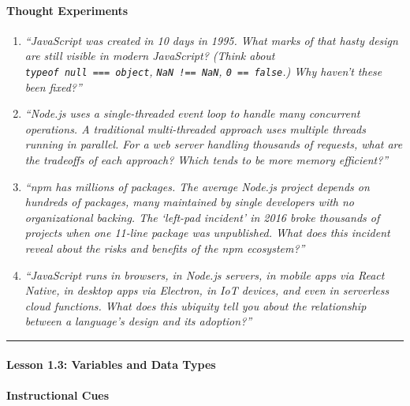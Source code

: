 \documentclass[
  justified,
  openright,
]{tufte-book}
\let\subsection\paragraph
\let\paragraph\paragraph
\let\subsection\paragraph
\let\paragraph\paragraph
\begin{document}
\paragraph{Thought Experiments}\label{thought-experiments-18}

\begin{enumerate}
\def\labelenumi{\arabic{enumi}.}
\item
  \emph{``JavaScript was created in 10 days in 1995. What marks of that
  hasty design are still visible in modern JavaScript? (Think about
  \texttt{typeof\ null\ ===\ \textquotesingle{}object\textquotesingle{}},
  \texttt{NaN\ !==\ NaN}, \texttt{0\ ==\ false}.) Why haven't these been
  fixed?''}
\item
  \emph{``Node.js uses a single-threaded event loop to handle many
  concurrent operations. A traditional multi-threaded approach uses
  multiple threads running in parallel. For a web server handling
  thousands of requests, what are the tradeoffs of each approach? Which
  tends to be more memory efficient?''}
\item
  \emph{``npm has millions of packages. The average Node.js project
  depends on hundreds of packages, many maintained by single developers
  with no organizational backing. The `left-pad incident' in 2016 broke
  thousands of projects when one 11-line package was unpublished. What
  does this incident reveal about the risks and benefits of the npm
  ecosystem?''}
\item
  \emph{``JavaScript runs in browsers, in Node.js servers, in mobile
  apps via React Native, in desktop apps via Electron, in IoT devices,
  and even in serverless cloud functions. What does this ubiquity tell
  you about the relationship between a language's design and its
  adoption?''}
\end{enumerate}

\begin{center}\rule{0.5\linewidth}{0.5pt}\end{center}

\subsection{Lesson 1.3: Variables and Data
Types}\label{lesson-1.3-variables-and-data-types}

\paragraph{Instructional Cues}\label{instructional-cues-12}
\end{document}
